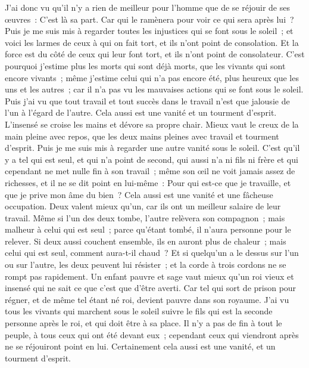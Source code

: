 \begin{multicols}{2}
J'ai donc vu qu'il n'y a rien de meilleur pour l'homme que de se réjouir de ses œuvres~: C'est là sa part. Car qui le ramènera pour voir ce qui sera après lui~?
\VerseOne{}Puis je me suis mis à regarder toutes les injustices qui se font sous le soleil~; et voici les larmes de ceux à qui on fait tort, et ils n'ont point de consolation. Et la force est du côté de ceux qui leur font tort, et ils n'ont point de consolateur.
C'est pourquoi j'estime plus les morts qui sont déjà morts, que les vivants qui sont encore vivants~;
même j'estime celui qui n'a pas encore été, plus heureux que les uns et les autres~; car il n'a pas vu les mauvaises actions qui se font sous le soleil.
Puis j'ai vu que tout travail et tout succès dans le travail n'est que jalousie de l'un à l'égard de l'autre. Cela aussi est une vanité et un tourment d'esprit.
L'insensé se croise les mains et dévore sa propre chair.
Mieux vaut le creux de la main pleine avec repos, que les deux mains pleines avec travail et tourment d'esprit.
Puis je me suis mis à regarder une autre vanité sous le soleil.
C'est qu'il y a tel qui est seul, et qui n'a point de second, qui aussi n'a ni fils ni frère et qui cependant ne met nulle fin à son travail~; même son œil ne voit jamais assez de richesses, et il ne se dit point en lui-même~: Pour qui est-ce que je travaille, et que je prive mon âme du bien~? Cela aussi est une vanité et une fâcheuse occupation.
Deux valent mieux qu'un, car ils ont un meilleur salaire de leur travail.
Même si l'un des deux tombe, l'autre relèvera son compagnon~; mais malheur à celui qui est seul~; parce qu'étant tombé, il n'aura personne pour le relever.
Si deux aussi couchent ensemble, ils en auront plus de chaleur~; mais celui qui est seul, comment aura-t-il chaud~?
Et si quelqu'un a le dessus sur l'un ou sur l'autre, les deux peuvent lui résister~; et la corde à trois cordons ne se rompt pas rapidement.
Un enfant pauvre et sage vaut mieux qu'un roi vieux et insensé qui ne sait ce que c'est que d'être averti.
Car tel qui sort de prison pour régner, et de même tel étant né roi, devient pauvre dans son royaume.
J'ai vu tous les vivants qui marchent sous le soleil suivre le fils qui est la seconde personne après le roi, et qui doit être à sa place.
Il n'y a pas de fin à tout le peuple, à tous ceux qui ont été devant eux~; cependant ceux qui viendront après ne se réjouiront point en lui. Certainement cela aussi est une vanité, et un tourment d'esprit.

\end{multicols}
